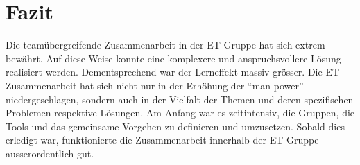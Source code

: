 \section{Fazit}
    Die teamübergreifende Zusammenarbeit in der ET-Gruppe hat sich extrem bewährt. Auf diese Weise 
    konnte eine komplexere und anspruchsvollere Lösung realisiert werden. Dementsprechend war der 
    Lerneffekt massiv grösser. Die ET-Zusammenarbeit hat sich nicht nur in der Erhöhung der \enquote{man-power} 
    niedergeschlagen, sondern auch in der Vielfalt der Themen und deren spezifischen Problemen respektive 
    Lösungen. Am Anfang war es zeitintensiv, die Gruppen, die Tools und das gemeinsame Vorgehen zu 
    definieren und umzusetzen. Sobald dies erledigt war, funktionierte die Zusammenarbeit innerhalb 
    der ET-Gruppe ausserordentlich gut.